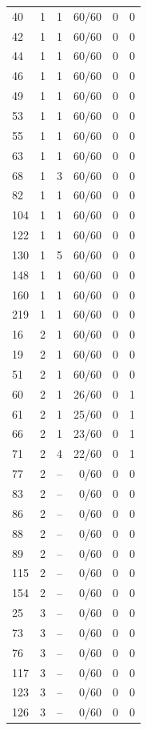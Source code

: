 \begin{longtable}{lrrrrr}
40 & 1 & 1 & 60/60 & 0 & 0 \\
42 & 1 & 1 & 60/60 & 0 & 0 \\
44 & 1 & 1 & 60/60 & 0 & 0 \\
46 & 1 & 1 & 60/60 & 0 & 0 \\
49 & 1 & 1 & 60/60 & 0 & 0 \\
53 & 1 & 1 & 60/60 & 0 & 0 \\
55 & 1 & 1 & 60/60 & 0 & 0 \\
63 & 1 & 1 & 60/60 & 0 & 0 \\
68 & 1 & 3 & 60/60 & 0 & 0 \\
82 & 1 & 1 & 60/60 & 0 & 0 \\
104 & 1 & 1 & 60/60 & 0 & 0 \\
122 & 1 & 1 & 60/60 & 0 & 0 \\
130 & 1 & 5 & 60/60 & 0 & 0 \\
148 & 1 & 1 & 60/60 & 0 & 0 \\
160 & 1 & 1 & 60/60 & 0 & 0 \\
219 & 1 & 1 & 60/60 & 0 & 0 \\
16 & 2 & 1 & 60/60 & 0 & 0 \\
19 & 2 & 1 & 60/60 & 0 & 0 \\
51 & 2 & 1 & 60/60 & 0 & 0 \\
60 & 2 & 1 & 26/60 & 0 & 1 \\
61 & 2 & 1 & 25/60 & 0 & 1 \\
66 & 2 & 1 & 23/60 & 0 & 1 \\
71 & 2 & 4 & 22/60 & 0 & 1 \\
77 & 2 & -- & 0/60 & 0 & 0 \\
83 & 2 & -- & 0/60 & 0 & 0 \\
86 & 2 & -- & 0/60 & 0 & 0 \\
88 & 2 & -- & 0/60 & 0 & 0 \\
89 & 2 & -- & 0/60 & 0 & 0 \\
115 & 2 & -- & 0/60 & 0 & 0 \\
154 & 2 & -- & 0/60 & 0 & 0 \\
25 & 3 & -- & 0/60 & 0 & 0 \\
73 & 3 & -- & 0/60 & 0 & 0 \\
76 & 3 & -- & 0/60 & 0 & 0 \\
117 & 3 & -- & 0/60 & 0 & 0 \\
123 & 3 & -- & 0/60 & 0 & 0 \\
126 & 3 & -- & 0/60 & 0 & 0 \\
\end{longtable}
